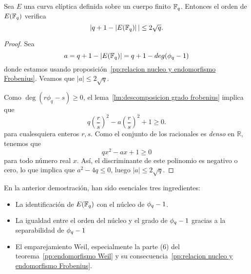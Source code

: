 \begin{teorema}
	Sea $E$ una curva elíptica definida sobre un cuerpo finito $\mathbb{F}_q$. Entonces el orden de $E(\mathbb{F}_q)$ verifica
	$$
		|q + 1 - \left\vert{E(\mathbb{F}_{q})}\right\vert| \le 2 \sqrt{q}.
	$$
\end{teorema}
\begin{proof}
Sea
$$
	a = q + 1 - \left\vert{E(\mathbb{F}_{q})}\right\vert = q + 1 - deg(\phi_q - 1)
$$
donde estamos usando proposición~\ref{pp:relacion nucleo y endomorfismo Frobenius}. Veamos que $|a| \le 2 \sqrt{q}$.

Como $\deg(r \phi_q - s) \ge 0$, el lema~\ref{lm:descomposicion grado frobenius} implica que
$$
q \left( \frac{r}{s} \right)^2 - a \left(\frac{r}{s} \right) ^2 + 1 \ge 0.
$$
para cualesquiera enteros $r, s$. Como el conjunto de los racionales es \emph{denso} en $\mathbb{R}$, tenemos que
$$
q x^2 - a x + 1 \ge 0
$$
para todo número real $x$. Así, el discriminante de este polinomio es negativo o cero, lo que implica que $a^2 - 4 q \le 0$, luego $| a | \le 2 \sqrt{q}$.
\end{proof}

En la anterior demostración, han sido esenciales tres ingredientes:
\begin{itemize}
	\item La identificación de $E(\mathbb{F}_q)$ con el núcleo de $\phi_q - 1$.
	\item La igualdad entre el orden del núcleo y el grado de $\phi_q - 1$ gracias a la separabilidad de $\phi_q - 1$
	\item El emparejamiento Weil, especialmente la parte (6) del teorema~\ref{pp:endomorfismo Weil} y su consecuencia~\ref{pp:relacion nucleo y endomorfismo Frobenius}.
\end{itemize}

